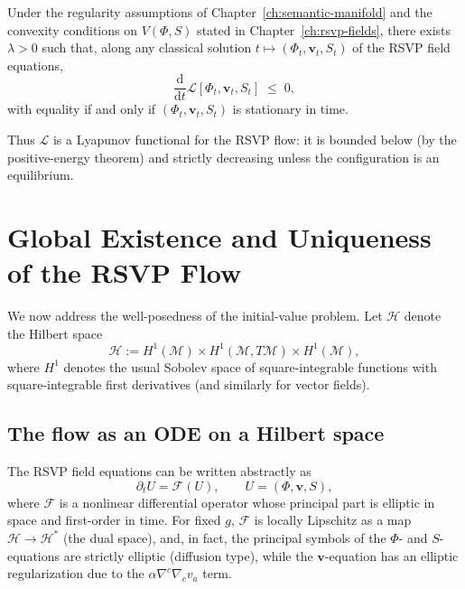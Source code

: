 \begin{proposition}
\label{prop:L-monotone}
Under the regularity assumptions of Chapter~\ref{ch:semantic-manifold} and the
convexity conditions on $V(\Phi,S)$ stated in Chapter~\ref{ch:rsvp-fields},
there exists $\lambda > 0$ such that, along any classical solution
$t\mapsto (\Phi_t,\mathbf{v}_t,S_t)$ of the RSVP field equations,
\begin{equation}
\label{eq:L-monotone}
\frac{\mathrm{d}}{\mathrm{d}t}\mathscr{L}[\Phi_t,\mathbf{v}_t,S_t]
\;\le\; 0,
\end{equation}
with equality if and only if $(\Phi_t,\mathbf{v}_t,S_t)$ is stationary in time.
\end{proposition}

Thus $\mathscr{L}$ is a Lyapunov functional for the RSVP flow: it is bounded
below (by the positive-energy theorem) and strictly decreasing unless the
configuration is an equilibrium.

\section{Global Existence and Uniqueness of the RSVP Flow}

We now address the well-posedness of the initial-value problem.  
Let $\mathcal{H}$ denote the Hilbert space
\[
\mathcal{H}
:= H^1(\mathcal{M})
 \times H^1(\mathcal{M},T\mathcal{M})
 \times H^1(\mathcal{M}),
\]
where $H^1$ denotes the usual Sobolev space of square-integrable functions with
square-integrable first derivatives (and similarly for vector fields).

\subsection{The flow as an ODE on a Hilbert space}

The RSVP field equations can be written abstractly as
\begin{equation}
\label{eq:abstract-flow}
\partial_t U = \mathcal{F}(U),
\qquad
U = (\Phi,\mathbf{v},S),
\end{equation}
where $\mathcal{F}$ is a nonlinear differential operator whose principal part
is elliptic in space and first-order in time.  
For fixed $g$, $\mathcal{F}$ is locally Lipschitz as a map
$\mathcal{H} \to \mathcal{H}^*$ (the dual space), and, in fact, the principal
symbols of the $\Phi$- and $S$-equations are strictly elliptic (diffusion type),
while the $\mathbf{v}$-equation has an elliptic regularization due to the
$\alpha \nabla^c\nabla_c v_a$ term.

